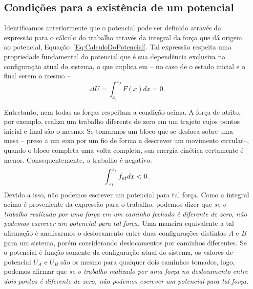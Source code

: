 
\subsection{Condições para a existência de um potencial}

Identificamos anteriormente que o potencial pode ser definido através da expressão para o cálculo do trabalho através da integral da força que dá origem ao potencial, Equação~\eqref{Eq:CalculoDoPotencial}. Tal expressão respeita uma propriedade fundamental do potencial que é sua dependência exclusiva na configuração atual do sistema, o que implica em -- no caso de o estado inicial e o final serem o mesmo --
\begin{equation}
  \Delta U = \int_{x_i}^{x_f} F(x) dx = 0.
\end{equation}

Entretanto, nem todas as forças respeitam a condição acima. A força de atrito, por exemplo, realiza um trabalho diferente de zero em um trajeto cujos pontos inicial e final são o mesmo: Se tomarmos um bloco que se desloca sobre uma mesa -- preso a um eixo por um fio de forma a descrever um movimento circular--, quando o bloco completa uma volta completa, sua energia cinética certamente é menor. Consequentemente, o trabalho é negativo:
\begin{equation}
  \int_{x_i}^{x_i} f_{at} dx < 0.
\end{equation}
%
Devido a isso, não podemos escrever um potencial para tal força. Como a integral acima é proveniente da expressão para o trabalho, podemos dizer que \emph{se o trabalho realizado por uma força em um caminho fechado é diferente de zero, não podemos escrever um potencial para tal força.} Uma maneira equivalente a tal afirmação é analisarmos o deslocamento entre duas configurações distintas $A$ e $B$ para um sistema, porém considerando deslocamentos por caminhos diferentes. Se o potencial é função somente da configuração atual do sistema, os valores de potencial $U_A$ e $U_B$ são os mesmo para qualquer dois caminhos tomados, logo, podemos afirmar que \emph{se o trabalho realizado por uma força no deslocamento entre dois pontos é diferente de zero, não podemos escrever um potencial para tal força.}

